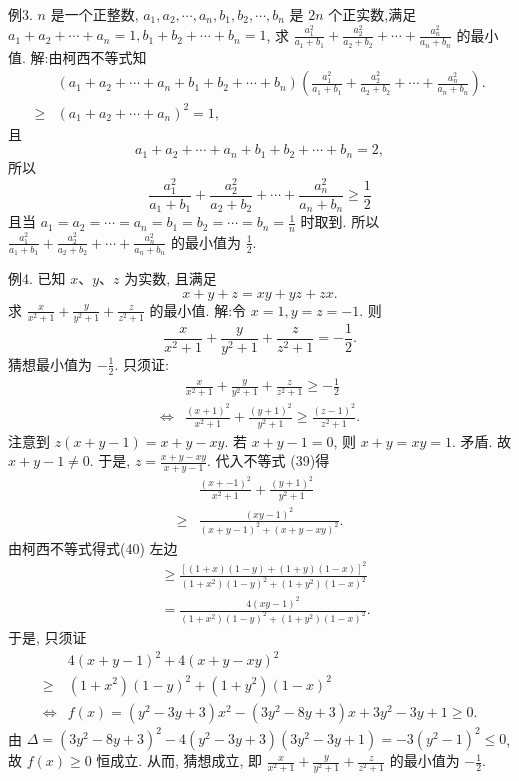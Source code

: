 例3. $n$ 是一个正整数, $a_1, a_2, \cdots, a_n, b_1, b_2, \cdots, b_n$ 是 $2 n$ 个正实数,满足 $a_1+a_2+\cdots+a_n=1, b_1+b_2+\cdots+b_n=1$, 求 $\frac{a_1^2}{a_1+b_1}+\frac{a_2^2}{a_2+b_2}+\cdots+\frac{a_n^2}{a_n+b_n}$ 的最小值.
解:由柯西不等式知
$$
\begin{aligned}
& \left(a_1+a_2+\cdots+a_n+b_1+b_2+\cdots+b_n\right)\left(\frac{a_1^2}{a_1+b_1}+\frac{a_2^2}{a_2+b_2}+\cdots+\frac{a_n^2}{a_n+b_n}\right) . \\
\geqslant & \left(a_1+a_2+\cdots+a_n\right)^2=1,
\end{aligned}
$$
且
$$
a_1+a_2+\cdots+a_n+b_1+b_2+\cdots+b_n=2,
$$
所以
$$
\frac{a_1^2}{a_1+b_1}+\frac{a_2^2}{a_2+b_2}+\cdots+\frac{a_n^2}{a_n+b_n} \geqslant \frac{1}{2}
$$
且当 $a_1=a_2=\cdots=a_n=b_1=b_2=\cdots=b_n=\frac{1}{n}$ 时取到.
所以 $\frac{a_1^2}{a_1+b_1}+\frac{a_2^2}{a_2+b_2}+\cdots+\frac{a_n^2}{a_n+b_n}$ 的最小值为 $\frac{1}{2}$.



例4. 已知 $x 、 y 、 z$ 为实数, 且满足
$$
x+y+z=x y+y z+z x .
$$
求 $\frac{x}{x^2+1}+\frac{y}{y^2+1}+\frac{z}{z^2+1}$ 的最小值.
解:令 $x=1, y=z=-1$. 则
$$
\frac{x}{x^2+1}+\frac{y}{y^2+1}+\frac{z}{z^2+1}=-\frac{1}{2} .
$$
猜想最小值为 $-\frac{1}{2}$.
只须证:
$$
\begin{aligned}
& \frac{x}{x^2+1}+\frac{y}{y^2+1}+\frac{z}{z^2+1} \geqslant-\frac{1}{2} \\
\Leftrightarrow & \frac{(x+1)^2}{x^2+1}+\frac{(y+1)^2}{y^2+1} \geqslant \frac{(z-1)^2}{z^2+1} .
\end{aligned} \label{(39)}
$$
注意到 $z(x+y-1)=x+y-x y$.
若 $x+y-1=0$, 则 $x+y=x y=1$. 矛盾.
故 $x+y-1 \neq 0$.
于是, $z=\frac{x+y-x y}{x+y-1}$.
代入不等式 (39)得
$$
\begin{aligned}
& \frac{(x+-1)^2}{x^2+1}+\frac{(y+1)^2}{y^2+1} \\
\geqslant & \frac{(x y-1)^2}{(x+y-1)^2+(x+y-x y)^2} .
\end{aligned} \label{(40)}
$$
由柯西不等式得式(40) 左边
$$
\begin{aligned}
& \geqslant \frac{[(1+x)(1-y)+(1+y)(1-x)]^2}{\left(1+x^2\right)(1-y)^2+\left(1+y^2\right)(1-x)^2} \\
& =\frac{4(x y-1)^2}{\left(1+x^2\right)(1-y)^2+\left(1+y^2\right)(1-x)^2} .
\end{aligned}
$$
于是, 只须证
$$
\begin{aligned}
& 4(x+y-1)^2+4(x+y-x y)^2 \\
\geqslant & \left(1+x^2\right)(1-y)^2+\left(1+y^2\right)(1-x)^2 \\
\Leftrightarrow & f(x)=\left(y^2-3 y+3\right) x^2-\left(3 y^2-8 y+3\right) x+3 y^2-3 y+1 \geqslant 0 .
\end{aligned}
$$
由 $\Delta=\left(3 y^2-8 y+3\right)^2-4\left(y^2-3 y+3\right)\left(3 y^2-3 y+1\right)= -3\left(y^2-1\right)^2 \leqslant 0$, 故 $f(x) \geqslant 0$ 恒成立.
从而, 猜想成立, 即 $\frac{x}{x^2+1}+\frac{y}{y^2+1}+\frac{z}{z^2+1}$ 的最小值为 $-\frac{1}{2}$.



